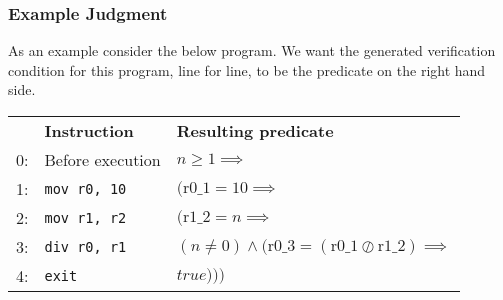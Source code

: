 







\subsubsection{Example Judgment}

As an example consider the below program. We want the generated verification condition for this program, line for line, to be the predicate on the right hand side.

\begin{tabular}{rll}
    & \textbf{Instruction} & \textbf{Resulting predicate}  \\
  0:& Before execution & $n \geq 1 \implies$ \\
  1:& \texttt{mov r0, 10} & $(\text{r0\_1} = 10 \implies $ \\
  2:& \texttt{mov r1, r2} & $(\text{r1\_2} = n \implies$  \\
  3:& \texttt{div r0, r1} & $(n \neq 0) \land (\text{r0\_3} = (\text{r0\_1} \oslash \text{r1\_2}) \implies$  \\
  4:& \texttt{exit} & $true)))$ \\
\end{tabular}

